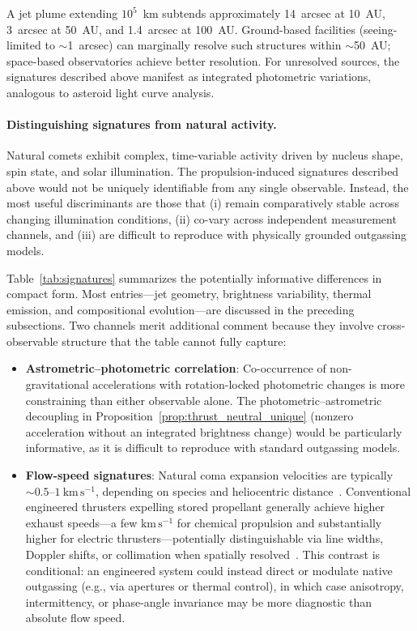 \documentclass{article}
\begin{document}
A jet plume extending $10^5$~km subtends approximately 14~arcsec at 10~AU, 3~arcsec at 50~AU, and 1.4~arcsec at 100~AU. Ground-based facilities (seeing-limited to $\sim$1~arcsec) can marginally resolve such structures within $\sim$50~AU; space-based observatories achieve better resolution. For unresolved sources, the signatures described above manifest as integrated photometric variations, analogous to asteroid light curve analysis.

\paragraph{Distinguishing signatures from natural activity.}
\label{sec:distinction_comparison}

Natural comets exhibit complex, time-variable activity driven by nucleus shape, spin state, and solar illumination. The propulsion-induced signatures described above would not be uniquely identifiable from any single observable. Instead, the most useful discriminants are those that (i) remain comparatively stable across changing illumination conditions, (ii) co-vary across independent measurement channels, and (iii) are difficult to reproduce with physically grounded outgassing models.

Table~\ref{tab:signatures} summarizes the potentially informative differences in compact form. Most entries---jet geometry, brightness variability, thermal emission, and compositional evolution---are discussed in the preceding subsections. Two channels merit additional comment because they involve cross-observable structure that the table cannot fully capture:

\begin{itemize}
    \item \textbf{Astrometric--photometric correlation}: Co-occurrence of non-gravitational accelerations with rotation-locked photometric changes is more constraining than either observable alone. The photometric--astrometric decoupling in Proposition~\ref{prop:thrust_neutral_unique} (nonzero acceleration without an integrated brightness change) would be particularly informative, as it is difficult to reproduce with standard outgassing models.

    \item \textbf{Flow-speed signatures}: Natural coma expansion velocities are typically $\sim0.5$--$1~\mathrm{km\,s^{-1}}$, depending on species and heliocentric distance~\cite{bockelee2004borrelly,jockers2011encke}. Conventional engineered thrusters expelling stored propellant generally achieve higher exhaust speeds---a few $\mathrm{km\,s^{-1}}$ for chemical propulsion and substantially higher for electric thrusters---potentially distinguishable via line widths, Doppler shifts, or collimation when spatially resolved~\cite{goebel2008thruster}. This contrast is conditional: an engineered system could instead direct or modulate native outgassing (e.g., via apertures or thermal control), in which case anisotropy, intermittency, or phase-angle invariance may be more diagnostic than absolute flow speed.
\end{itemize}
\end{document}
